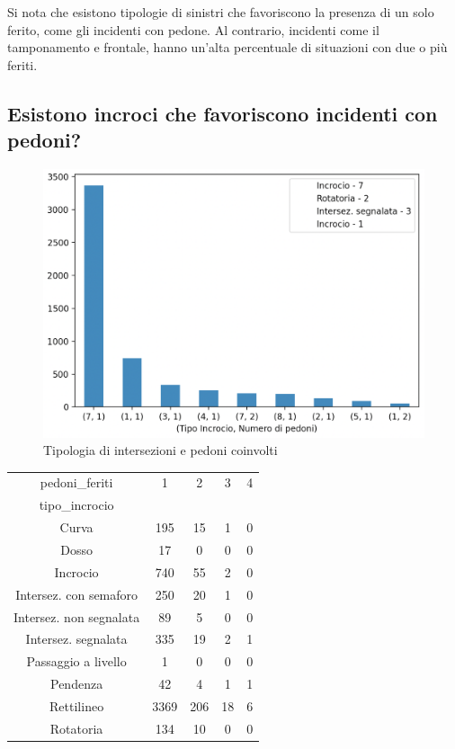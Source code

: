 \documentclass[a4paper]{report}
\begin{document}
Si nota che esistono tipologie di sinistri che favoriscono la presenza di un solo ferito, 
come gli incidenti con pedone. Al contrario, incidenti come il tamponamento e frontale, 
hanno un'alta percentuale di situazioni con due o più feriti.


\subsection{Esistono incroci che favoriscono incidenti con pedoni?}

\begin{figure}
    \includegraphics[width=\linewidth]{../src/incidenti/incidenti_senza_coords/pedoni/pedoni_incroci.png}
    \caption{Tipologia di intersezioni e pedoni coinvolti}
    \label{fig:pedoni_intersezioni}
\end{figure}

\begin{center}
    \def\arraystretch{1.5}%
    \begin{tabular}{ |c|c|c|c|c| } 
    \hline
    pedoni\_feriti            &  1  & 2   & 3   & 4  \\
    tipo\_incrocio            &     &     &     &    \\
    \hline
    Curva                    & 195 &  15 &   1 &   0\\
    Dosso                    &  17 &   0 &   0 &   0\\
    Incrocio                 & 740 &  55 &   2 &   0\\
    Intersez. con semaforo   & 250 &  20 &   1 &   0\\
    Intersez. non segnalata  &  89 &   5 &   0 &   0\\
    Intersez. segnalata      & 335 &  19 &   2 &   1\\
    Passaggio a livello      &   1 &   0 &   0 &   0\\
    Pendenza                 &  42 &   4 &   1 &   1\\
    Rettilineo               &3369 & 206 &  18 &   6\\
    Rotatoria                & 134 &  10 &   0 &   0\\
    \hline
    \end{tabular}
\end{center}
\end{document}
